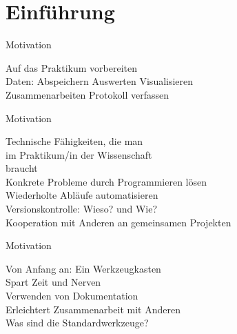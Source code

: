 \section{Einführung}

\begin{frame}{Motivation}
    \begin{center}
        \textcolor{vertexDarkRed}{\Huge Auf das Praktikum vorbereiten} \\[\baselineskip]
        \Large Daten:\hspace{2em} Abspeichern \hspace{2em} Auswerten \hspace{2em} Visualisieren \\ [\baselineskip]
        Zusammenarbeiten \hspace{2em} Protokoll verfassen\\
    \end{center}
\end{frame}

\begin{frame}{Motivation}
    \begin{center}
        \textcolor{vertexDarkRed}{\Huge Technische Fähigkeiten, die man \\ im Praktikum/in der Wissenschaft \\ braucht} \\[\baselineskip]
        \Large%
        Konkrete Probleme durch Programmieren lösen\\[\baselineskip]
        Wiederholte Abläufe automatisieren\\[\baselineskip]
        Versionskontrolle: Wieso? und Wie?\\[\baselineskip]
        Kooperation mit Anderen an gemeinsamen Projekten
    \end{center}
\end{frame}

\begin{frame}{Motivation}
    \begin{center}
        \textcolor{vertexDarkRed}{\Huge Von Anfang an: Ein Werkzeugkasten} \\[\baselineskip]
        \Large%
        Spart Zeit und Nerven\\[\baselineskip]
        Verwenden von Dokumentation\\[\baselineskip]
        Erleichtert Zusammenarbeit mit Anderen\\[\baselineskip]
        Was sind die Standardwerkzeuge?
    \end{center}
\end{frame}

